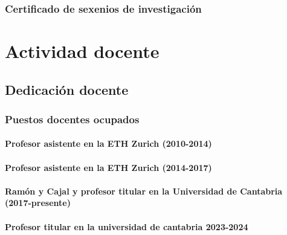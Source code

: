 \documentclass[a4paper, 11pt, twoside, openright]{report}
\begin{document}
\subsection{Certificado de sexenios de investigación}



\chapter{Actividad docente}

\section{Dedicación docente}

\subsection{Puestos docentes ocupados}

\subsubsection{Profesor asistente en la ETH Zurich (2010-2014)}
%

\subsubsection{Profesor asistente en la ETH Zurich (2014-2017)}
%

\subsubsection{Ramón y Cajal y profesor titular en la Universidad de Cantabria (2017-presente)}
%

\subsubsection{Profesor titular en la universidad de cantabria 2023-2024}
%
\end{document}

